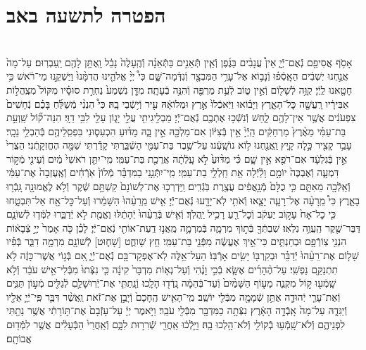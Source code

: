 \documentclass[twoside, openany, parskip=half, 11pt]{book}
\begin{document}
\begin{footnotesize}
\begin{multicols}{2}
\end{multicols}

\section*{הפטרה לתשעה באב}


\begin{multicols}{2}
 \\
אָסֹ֥ף אֲסִיפֵ֖ם נְֿאֻם־יְֿיָ֑ אֵין֩ עֲנָבִ֨ים בַּגֶּ֜פֶן וְֿאֵ֧ין תְּֿאֵנִ֣ים בַּתְּֿאֵנָ֗ה וְֿהֶֽעָלֶה֙ נָבֵ֔ל וָֽאֶתֵּ֥ן לָהֶ֖ם יַֽעַבְרֽוּם׃ עַל־מָה֙ אֲנַ֣חְנוּ יֽשְׁבִ֔ים הֵאָֽסְֿפ֗וּ וְֿנָב֛וֹא אֶל־עָרֵ֥י הַמִּבְצָ֖ר וְֿנִדְּֿמָה־שָּׁ֑ם כִּי֩ יְיָ֨ אֱלֹהֵ֤ינוּ הֲדִמָּ֨נוּ֙ וַיַּשְׁקֵ֣נוּ מֵי־רֹ֔אשׁ כִּ֥י חָטָ֖אנוּ לַֽיְֿיָ׃ קַוֵּ֥ה לְֿשָׁל֖וֹם וְֿאֵ֣ין ט֑וֹב לְֿעֵ֥ת מַרְפֵּ֖ה וְֿהִנֵּ֥ה בְֿעָתָֽה׃ מִדָּ֤ן נִשְׁמַע֙ נַחְרַ֣ת סוּסָ֗יו מִקּוֹל֙ מִצְֽהֲל֣וֹת אַבִּירָ֔יו רָֽעֲשָׁ֖ה כׇּל־הָאָ֑רֶץ וַיָּב֗וֹאוּ וַיֹּֽאכְֿלוּ֙ אֶ֣רֶץ וּמְלוֹאָ֔הּ עִ֖יר וְֿי֥שְֿׁבֵי בָֽהּ׃ כִּי֩ הִנְנִ֨י מְֿשַׁלֵּ֜חַ בָּכֶ֗ם נְֿחָשִׁים֙ צִפְעֹנִ֔ים אֲשֶׁ֥ר אֵין־לָהֶ֖ם לָ֑חַשׁ וְֿנִשְּֿׁכ֥וּ אֶתְכֶ֖ם נְֿאֻם־יְֿיָ׃ מַבְלִ֥יגִיתִ֖י עֲלֵ֣י יָג֑וֹן עָלַ֖י לִבִּ֥י דַוָּֽי׃ הִנֵּה־ק֞וֹל שַֽׁוְעַ֣ת בַּת־עַמִּ֗י מֵאֶ֨רֶץ֙ מַרְחַקִּ֔ים הַֽיְֿיָ֙ אֵ֣ין בְּֿצִיּ֔וֹן אִם־מַלְכָּ֖הּ אֵ֣ין בָּ֑הּ מַדּ֗וּעַ הִכְעִס֛וּנִי בִּפְסִֽלֵיהֶ֖ם בְּֿהַבְלֵ֥י נֵכָֽר׃ עָבַ֥ר קָצִ֖יר כָּ֣לָה קָ֑יִץ וַֽאֲנַ֖חְנוּ ל֥וֹא נוֹשָֽׁעְֿנוּ׃ עַל־שֶׁ֥בֶר בַּת־עַמִּ֖י הָשְֿׁבַּ֑רְתִּי קָדַ֕רְתִּי שַׁמָּ֖ה הֶחֱזִקָֽתְֿנִי׃ הַצֳרִי֙ אֵ֣ין בְּֿגִלְעָ֔ד אִם־רֹפֵ֖א אֵ֣ין שָׁ֑ם כִּ֗י מַדּ֨וּעַ֙ לֹ֣א עָֽלְֿתָ֔ה אֲרֻכַ֖ת בַּת־עַמִּֽי׃ מִֽי־יִתֵּ֤ן רֹאשִׁי֙ מַ֔יִם וְֿעֵינִ֖י מְֿק֣וֹר דִּמְעָ֑ה וְֿאֶבְכֶּה֙ יוֹמָ֣ם וָלַ֔יְֿלָה אֵ֖ת חַֽלְלֵ֥י בַת־עַמִּֽי׃ מִֽי־יִתְּֿנֵ֣נִי בַמִּדְבָּ֗ר מְֿלוֹן֙ אֹֽרְֿחִ֔ים וְֿאֶֽעֶזְבָה֙ אֶת־עַמִּ֔י וְֿאֵֽלְֿכָ֖ה מֵאִתָּ֑ם כִּ֤י כֻלָּם֙ מְֿנָ֣אֲפִ֔ים עֲצֶ֖רֶת בֹּֽגְֿדִֽים׃ וַֽיַּדְרְכ֤וּ אֶת־לְשׁוֹנָם֙ קַשְׁתָּ֣ם שֶׁ֔קֶר וְֿלֹ֥א לֶאֱמוּנָ֖ה גָּֽבְֿר֣וּ בָאָ֑רֶץ כִּי֩ מֵֽרָעָ֨ה אֶל־רָעָ֧ה יָצָ֛אוּ וְֿאֹתִ֥י לֹֽא־יָדָ֖עוּ נְֿאֻם־יְֿיָ׃ אִ֤ישׁ מֵֽרֵעֵ֨הוּ֙ הִשָּׁמֵ֔רוּ וְֿעַל־כׇּל־אָ֖ח אַל־תִּבְטָ֑חוּ כִּ֤י כׇל־אָח֙ עָק֣וֹב יַעְקֹ֔ב וְֿכׇל־רֵ֖עַ רָכִ֥יל יַֽהֲלֹֽךְ׃ וְֿאִ֤ישׁ בְּֿרֵעֵ֨הוּ֙ יְֿהָתֵ֔לּוּ וֶאֱמֶ֖ת לֹ֣א יְֿדַבֵּ֑רוּ לִמְּֿד֧וּ לְֿשׁוֹנָ֛ם דַּבֶּר־שֶׁ֖קֶר הַֽעֲוֵ֥ה נִלְאֽוּ׃ שִׁבְתְּֿךָ֖ בְּֿת֣וֹךְ מִרְמָ֑ה בְּֿמִרְמָ֛ה מֵֽאֲנ֥וּ דַֽעַת־אוֹתִ֖י נְֿאֻם־יְֿיָ׃ לָכֵ֗ן כֹּ֤ה אָמַר֙ יְיָ֣ צְֿבָא֔וֹת הִנְנִ֥י צֽוֹרְֿפָ֖ם וּבְחַנְתִּ֑ים כִּי־אֵ֣יךְ אֶעֱשֶׂ֔ה מִפְּֿנֵ֖י בַּת־עַמִּֽי׃ חֵ֥ץ שָׁוחֻ֛ט [שָׁח֛וּט] לְֿשׁוֹנָ֖ם מִרְמָ֣ה דִבֵּ֑ר בְּֿפִ֗יו שָׁל֤וֹם אֶת־רֵעֵ֨הוּ֙ יְֿדַבֵּ֗ר וּבְקִרְבּ֖וֹ יָשִׂ֥ים אָרְֿבּֽוֹ׃ הַעַל־אֵ֥לֶּה לֹֽא־אֶפְקָד־בָּ֖ם נְֿאֻם־יְֿיָ֑ אִ֚ם בְּֿג֣וֹי אֲשֶׁר־כָּזֶ֔ה לֹ֥א תִתְנַקֵּ֖ם נַפְשִֽׁי׃ עַל־הֶ֨הָרִ֜ים אֶשָּׂ֧א בְֿכִ֣י וָנֶ֗הִי וְֿעַל־נְא֤וֹת מִדְבָּר֙ קִינָ֔ה כִּ֤י נִצְּֿתוּ֙ מִבְּֿלִי־אִ֣ישׁ עֹבֵ֔ר וְֿלֹ֥א שָֽׁמְֿע֖וּ ק֣וֹל מִקְנֶ֑ה מֵע֤וֹף הַשָּׁמַ֨יִם֙ וְֿעַד־בְּֿהֵמָ֔ה נָֽדְֿד֖וּ הָלָֽכוּ׃ וְֿנָֽתַתִּ֧י אֶת־יְֿרֽוּשָׁלַ֛םִ לְֿגַלִּ֖ים מְֿע֣וֹן תַּנִּ֑ים וְֿאֶת־עָרֵ֧י יְֿהוּדָ֛ה אֶתֵּ֥ן שְֿׁמָמָ֖ה מִבְּֿלִ֖י יוֹשֵֽׁב׃ מִֽי־הָאִ֤ישׁ הֶֽחָכָם֙ וְֿיָבֵ֣ן אֶת־זֹ֔את וַֽאֲשֶׁ֨ר דִּבֶּ֧ר פִּֽי־יְֿיָ֛ אֵלָ֖יו וְֿיַגִּדָ֑הּ עַל־מָה֙ אָֽבְֿדָ֣ה הָאָ֔רֶץ נִצְּֿתָ֥ה כַמִּדְבָּ֖ר מִבְּֿלִ֖י עֹבֵֽר׃ וַיֹּ֣אמֶר יְיָ֔ עַל־עָזְֿבָם֙ אֶת־תּ֣וֹרָתִ֔י אֲשֶׁ֥ר נָתַ֖תִּי לִפְנֵיהֶ֑ם וְֿלֹא־שָֽׁמְֿע֥וּ בְֿקוֹלִ֖י וְֿלֹא־הָ֥לְכוּ בָֽהּ׃ וַיֵּ֣לְֿכ֔וּ אַֽחֲרֵ֖י שְֿׁרִר֣וּת לִבָּ֑ם וְֿאַֽחֲרֵי֙ הַבְּֿעָלִ֔ים אֲשֶׁ֥ר לִמְּֿד֖וּם אֲבוֹתָֽם׃ 
\end{multicols}
\end{footnotesize}
\end{document}
